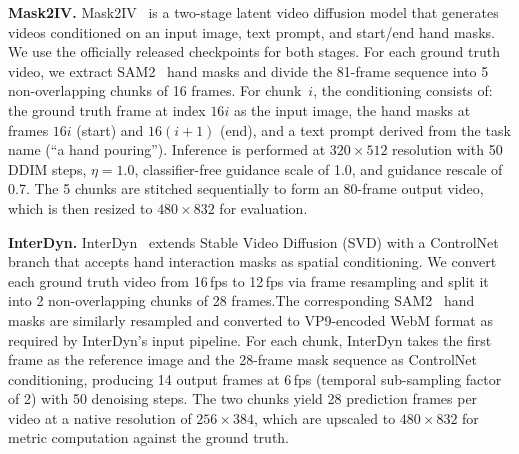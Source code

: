 \noindent 
\textbf{Mask2IV.}     
Mask2IV~\citep{li2026mask2iv} is a two-stage latent video diffusion model that generates videos conditioned on an input image, text prompt, and start/end hand masks. We use the officially released checkpoints for both stages. For each ground truth video, we extract SAM2~\citep{ravi2025sam} hand masks and divide the 81-frame sequence into 5 non-overlapping chunks of 16 frames. For chunk~$i$, the conditioning consists of: the ground truth frame at index $16i$ as the input image, the hand masks at frames $16i$ (start) and $16(i+1)$ (end), and a text prompt derived from the task name (\eg ``a hand pouring''). Inference is performed at $320\times 512$ resolution with 50 DDIM steps, $\eta=1.0$, classifier-free guidance scale of 1.0, and guidance rescale of 0.7. The 5 chunks are stitched sequentially to form an 80-frame output video, which is then resized to $480\times 832$ for evaluation.

\noindent 
\textbf{InterDyn.}
InterDyn~\citep{akkerman2025interdyn} extends Stable Video Diffusion (SVD) with a ControlNet branch that accepts hand interaction masks as spatial conditioning. We convert each ground truth video from 16\,fps to 12\,fps via frame resampling and split it into 2 non-overlapping chunks of 28 frames.The corresponding SAM2~\citep{ravi2025sam} hand masks are similarly resampled and converted to VP9-encoded WebM format as required by InterDyn's input pipeline. For each chunk, InterDyn takes the first frame as the reference image and the 28-frame mask sequence as ControlNet conditioning, producing 14 output frames at 6\,fps (temporal sub-sampling factor of 2) with 50 denoising steps. The two chunks yield 28 prediction frames per video at a native resolution of $256\times 384$, which are upscaled to $480\times 832$ for metric computation against the ground truth. 























